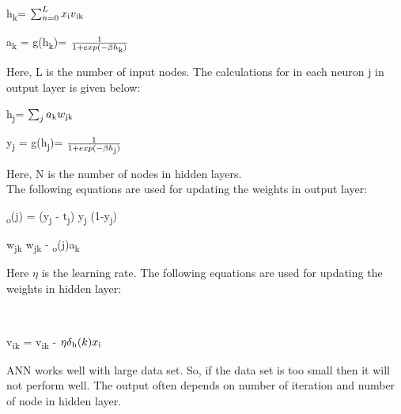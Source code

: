 \documentclass{standalone}
\begin{document}
\begin{center}
	\makebox h\textsubscript{k}= $\sum_{n=0}^{L} x\textsubscript{i}v\textsubscript{ik}$
\end{center}
\begin{center}
	\makebox a\textsubscript{k} = g(h\textsubscript{k})= $ \frac {1}{1+exp(-\beta h\textsubscript{k})}$
\end{center}
Here, L is the number of input nodes. The calculations for in each neuron j in output layer is given below:\\
\begin{center}
	\makebox  h\textsubscript{j}= $\sum_{j} a\textsubscript{k}w\textsubscript{jk}$
\end{center}
\begin{center}
	\makebox y\textsubscript{j} = g(h\textsubscript{j})= $ \frac {1}{1+exp(-\beta h\textsubscript{j})}$
\end{center}
Here, N is the number of nodes in hidden layers.\\
The following equations are used for updating the weights in output layer:\\
\begin{center}
	\makebox  \delta\textsubscript{o}(j) = (y\textsubscript{j} - t\textsubscript{j}) y\textsubscript{j} (1-y\textsubscript{j})  \\
\end{center}
\begin{center}
	\makebox  w\textsubscript{jk} \Leftarrow w\textsubscript{jk} - \eta\delta\textsubscript{o}(j)a\textsubscript{k} \\
\end{center}
Here $\eta$ is the learning rate. The following equations are used for updating the weights in hidden layer:\\
\begin{center}
\end{center}
\\
\begin{center}
	\makebox  v\textsubscript{ik} =  v\textsubscript{ik} - $\eta\delta\textsubscript{h}(k)x\textsubscript{i}  $\\
\end{center}
ANN works well with large data set. So, if the data set is too small then it will not perform well. The output often depends on number of iteration and number of node in hidden layer. \\
\end{document}
